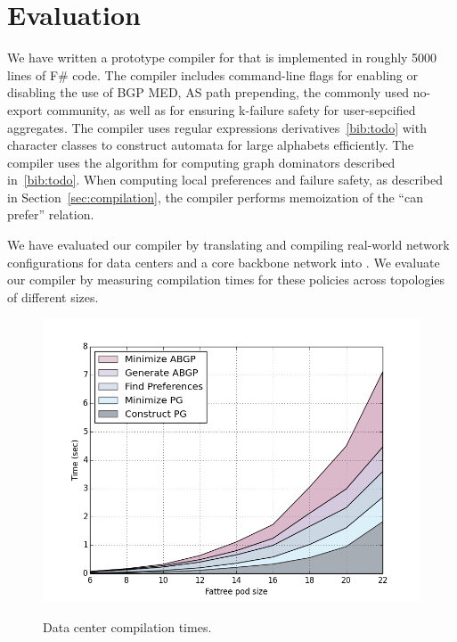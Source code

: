 \section{Evaluation}

We have written a prototype compiler for \sysname that is implemented in roughly 5000 lines of F\# code. The compiler includes command-line flags for enabling or disabling the use of BGP MED, AS path prepending, the commonly used no-export community, as well as for ensuring k-failure safety for user-sepcified aggregates. The compiler uses regular expressions derivatives~\ref{bib:todo} with character classes to construct automata for large alphabets efficiently. The compiler uses the algorithm for computing graph dominators described in~\ref{bib:todo}. When computing local preferences and failure safety, as described in Section~\ref{sec:compilation}, the compiler performs memoization of the ``can prefer'' relation. 

We have evaluated our compiler by translating and compiling real-world network configurations for data centers and a core backbone network into \sysname. We evaluate our compiler by measuring compilation times for these policies across topologies of different sizes.

\begin{figure}[t!]
\centering
\includegraphics[width=\columnwidth]{figures/compilation-times-dc.png}
\label{fig:compilation-times-dc}
\caption{Data center compilation times.}
\end{figure}

